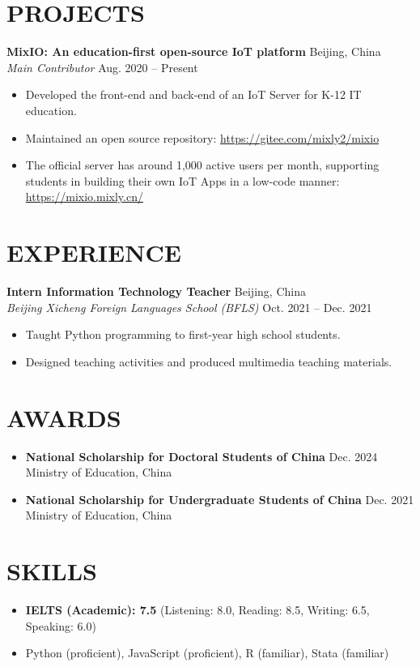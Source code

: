 \documentclass[a4paper,9pt]{extarticle}
\begin{document}
\section*{PROJECTS}
\noindent
\textbf{MixIO: An education-first open-source IoT platform} \hfill Beijing, China\\ %
\textit{Main Contributor} \hfill Aug. 2020 – Present %

\begin{itemize}
    \item Developed the front-end and back-end of an IoT Server for K-12 IT education.
    \item Maintained an open source repository: \url{https://gitee.com/mixly2/mixio}
    \item The official server has around 1,000 active users per month, supporting students in building their own IoT Apps in a low-code manner: \url{https://mixio.mixly.cn/}
\end{itemize}

\section*{EXPERIENCE}
\noindent
\textbf{Intern Information Technology Teacher} \hfill Beijing, China\\ %
\textit{Beijing Xicheng Foreign Languages School (BFLS)} \hfill Oct. 2021 – Dec. 2021 %

\begin{itemize}
    \item Taught Python programming to first-year high school students.
    \item Designed teaching activities and produced multimedia teaching materials.
\end{itemize}

\section*{AWARDS}
\begin{itemize}
    \item \textbf{National Scholarship for Doctoral Students of China} \hfill Dec. 2024 \\
          \hfill Ministry of Education, China
    \item \textbf{National Scholarship for Undergraduate Students of China} \hfill Dec. 2021 \\
          \hfill Ministry of Education, China
\end{itemize}

\section*{SKILLS}
\begin{itemize}
    \item \textbf{IELTS (Academic): 7.5} (Listening: 8.0, Reading: 8.5, Writing: 6.5, Speaking: 6.0)
    \item Python (proficient), JavaScript (proficient), R (familiar), Stata (familiar)
\end{itemize}

\end{document}
